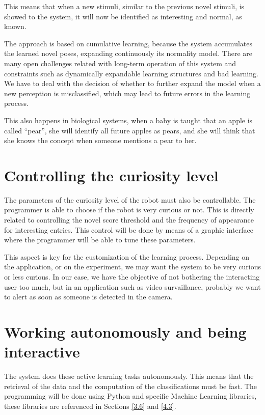 This means that when a new stimuli, similar to the previous novel stimuli, is showed to the system, it will now be identified as interesting and normal, as known. 

The approach is based on cumulative learning, because the system accumulates the learned novel poses, expanding continuously its normality model. There are many open challenges related with long-term operation of this system and constraints such as dynamically expandable learning structures and bad learning. We have to deal with the decision of whether to further expand the model when a new perception is misclassified, which may lead to future errors in the learning process. 

This also happens in biological systems, when a baby is taught that an apple is called “pear”, she will identify all future apples as pears, and she will think that she knows the concept when someone mentions a pear to her.

\section{Controlling the curiosity level}

The parameters of the curiosity level of the robot must also be controllable. The programmer is able to choose if the robot is very curious or not.
This is directly related to controlling the novel score threshold and the frequency of appearance for interesting entries. This control will be done by means of a graphic interface where the programmer will be able to tune these parameters.

This aspect is key for the customization of the learning process. Depending on the application, or on the experiment, we may want the system to be very curious or less curious. In our case, we have the objective of not bothering the interacting user too much, but in an application such as video survaillance, probably we want to alert as soon as someone is detected in the camera.

\section{Working autonomously and being interactive}

The system does these active learning tasks autonomously. This means that the retrieval of the data and the computation of the classifications must be fast. The programming will be done using Python and specific Machine Learning libraries, these libraries are referenced in Sections \ref{3.6} and \ref{4.3}.


